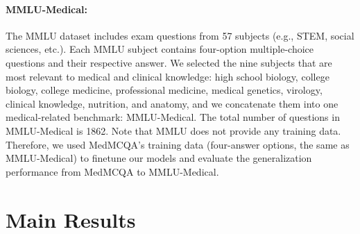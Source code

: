\documentclass{article}
\begin{document}
\paragraph{MMLU-Medical:} 
The MMLU dataset \citep{mmlu} includes exam questions from 57 subjects (e.g., STEM, social sciences, etc.). Each MMLU subject contains four-option multiple-choice questions and their respective answer. We selected the nine subjects that are most relevant to medical and clinical knowledge: high school biology, college biology, college medicine, professional medicine, medical genetics, virology, clinical knowledge, nutrition, and anatomy, and we concatenate them into one medical-related benchmark: MMLU-Medical. The total number of questions in MMLU-Medical is 1862. Note that MMLU does not provide any training data. Therefore, we used MedMCQA's training data (four-answer options, the same as MMLU-Medical) to finetune our models and evaluate the generalization performance from MedMCQA to MMLU-Medical.



\section{Main Results}
\end{document}
